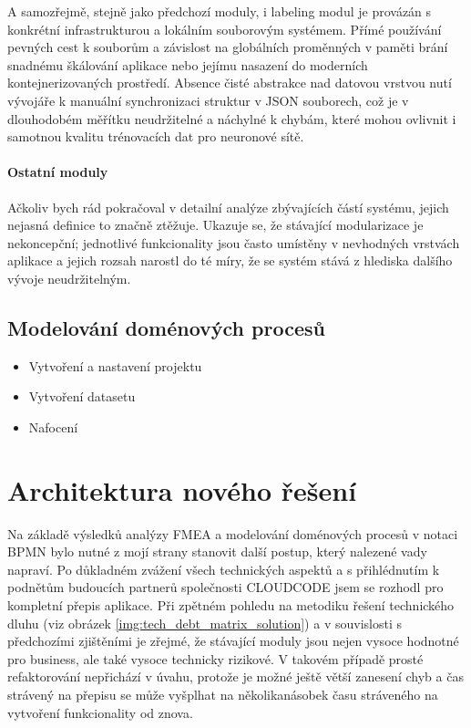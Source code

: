 \documentclass[FM,DP,fonts]{tulthesis}
\begin{document}
A samozřejmě, stejně jako předchozí moduly, i labeling modul je provázán s konkrétní infrastrukturou a lokálním souborovým systémem. Přímé používání pevných cest k souborům a závislost na globálních proměnných v paměti brání snadnému škálování aplikace nebo jejímu nasazení do moderních kontejnerizovaných prostředí. Absence čisté abstrakce nad datovou vrstvou nutí vývojáře k manuální synchronizaci struktur v JSON souborech, což je v dlouhodobém měřítku neudržitelné a náchylné k chybám, které mohou ovlivnit i samotnou kvalitu trénovacích dat pro neuronové sítě.

\subsubsection{Ostatní moduly}
Ačkoliv bych rád pokračoval v detailní analýze zbývajících částí systému, jejich nejasná definice to značně ztěžuje. Ukazuje se, že stávající modularizace je nekoncepční; jednotlivé funkcionality jsou často umístěny v nevhodných vrstvách aplikace a jejich rozsah narostl do té míry, že se systém stává z hlediska dalšího vývoje neudržitelným.

\section{Modelování doménových procesů}


\begin{itemize}
	\item Vytvoření a nastavení projektu
	\item Vytvoření datasetu
	\item Nafocení 
\end{itemize}

\chapter{Architektura nového řešení}
Na základě výsledků analýzy FMEA a modelování doménových procesů v notaci BPMN bylo nutné z mojí strany stanovit další postup, který nalezené vady napraví. Po důkladném zvážení všech technických aspektů a s přihlédnutím k podnětům budoucích partnerů společnosti CLOUDCODE jsem se rozhodl pro kompletní přepis aplikace. Při zpětném pohledu na metodiku řešení technického dluhu (viz obrázek \ref{img:tech_debt_matrix_solution}) a v souvislosti s předchozími zjištěními je zřejmé, že stávající moduly jsou nejen vysoce hodnotné pro business, ale také vysoce technicky rizikové. V takovém případě prosté refaktorování nepřichází v úvahu, protože je možné ještě větší zanesení chyb a čas strávený na přepisu se může vyšplhat na několikanásobek času stráveného na vytvoření funkcionality od znova.
\end{document}
